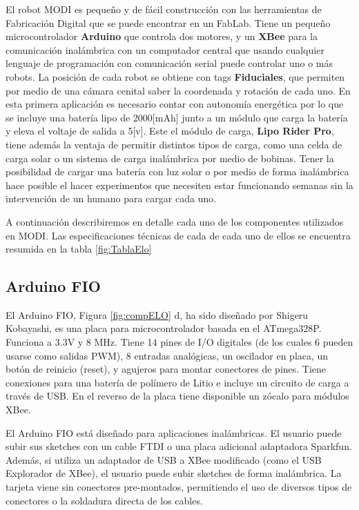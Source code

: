 El robot MODI es pequeño y de fácil construcción con las herramientas de Fabricación Digital que se puede encontrar en un FabLab. Tiene un pequeño microcontrolador \textbf{Arduino} que controla dos motores, y un \textbf{XBee} para la comunicación inalámbrica con un computador central que usando cualquier lenguaje de programación con comunicación serial puede controlar uno o más robots. La posición de cada robot se obtiene con tags \textbf{Fiduciales}, que permiten por medio de una cámara cenital saber la coordenada y rotación de cada uno. En esta primera aplicación es necesario contar con autonomía energética por lo que se incluye una batería lipo de 2000[mAh] junto a un módulo que carga la batería y eleva el voltaje de salida a 5[v]. Este el módulo de carga, \textbf{Lipo Rider Pro}, tiene además la ventaja de permitir distintos tipos de carga, como una celda de carga solar o un sistema de carga inalámbrica por medio de bobinas. Tener la posibilidad de cargar una batería con luz solar o por medio de forma inalámbrica hace posible el hacer experimentos que necesiten estar funcionando semanas sin la intervención de un humano para cargar cada uno.

A continuación describiremos en detalle cada uno de los componentes utilizados en MODI. Las especificaciones técnicas de cada de cada uno de ellos se encuentra resumida en la tabla \ref{fig:TablaElo}

\subsection{Arduino FIO}
El Arduino FIO, Figura \ref{fig:compELO} d, ha sido diseñado por Shigeru Kobayashi, es una placa para microcontrolador basada en el ATmega328P. Funciona a 3.3V y 8 MHz. Tiene 14 pines de I/O digitales (de los cuales 6 pueden usarse como salidas PWM), 8 entradas analógicas, un oscilador en placa, un botón de reinicio (reset), y agujeros para montar conectores de pines. Tiene conexiones para una batería de polímero de Litio e incluye un circuito de carga a través de USB. En el reverso de la placa tiene disponible un zócalo para módulos XBee.

El Arduino FIO está diseñado para aplicaciones inalámbricas. El usuario puede subir sus sketches con un cable FTDI o una placa adicional adaptadora Sparkfun. Además, si utiliza un adaptador de USB a XBee modificado (como el USB Explorador de XBee), el usuario puede subir sketches de forma inalámbrica. La tarjeta viene sin conectores pre-montados, permitiendo el uso de diversos tipos de conectores o la soldadura directa de los cables. 

